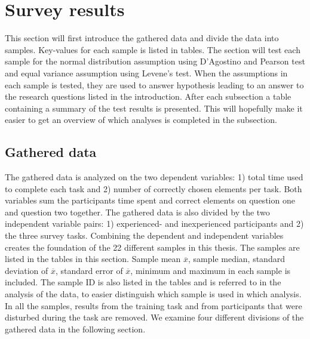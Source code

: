 \section{Survey results}\label{sec:survey_results}
This section will first introduce the gathered data and divide the data into samples. Key-values for each sample is listed in tables. The section will test each sample for the normal distribution assumption using D'Agostino and Pearson test and equal variance assumption using Levene's test. When the assumptions in each sample is tested, they are used to answer hypothesis leading to an answer to the research questions listed in the introduction. After each subsection a table containing a summary of the test results is presented. This will hopefully make it easier to get an overview of which analyses is completed in the subsection.   

\subsection{Gathered data}\label{sec:gathereddata}
The gathered data is analyzed on the two dependent variables: 1) total time used to complete each task and 2) number of correctly chosen elements per task. Both variables sum the participants time spent and correct elements on question one and question two together. The gathered data is also divided by the two independent variable pairs: 1) experienced- and inexperienced participants and 2) the three survey tasks. Combining the dependent and independent variables creates the foundation of the 22 different samples in this thesis. The samples are listed in the tables in this section. Sample mean $\overline{x}$, sample median, standard deviation of $\overline{x}$, standard error of $\overline{x}$, minimum and maximum in each sample is included. The sample ID is also listed in the tables and is referred to in the analysis of the data, to easier distinguish which sample is used in which analysis. In all the samples, results from the training task and from participants that were disturbed during the task are removed. We examine four different divisions of the gathered data in the following section.

